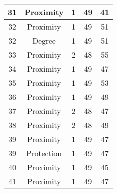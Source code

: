 \documentclass[results.tex]{subfiles}
\begin{document}
\begin{center}
\begin{tabular}{| c || c | c | c | c |}
            \hline
            31                      & Proximity                    & 1                      & 49                      & 41                   \\
            \hline
            32                      & Proximity                    & 1                      & 49                      & 51                   \\
            \hline
            32                      & Degree                       & 1                      & 49                      & 51                   \\
            \hline
            33                      & Proximity                    & 2                      & 48                      & 55                   \\
            \hline
            34                      & Proximity                    & 1                      & 49                      & 47                   \\
            \hline
            35                      & Proximity                    & 1                      & 49                      & 53                   \\
            \hline
            36                      & Proximity                    & 1                      & 49                      & 49                   \\
            \hline
            37                      & Proximity                    & 2                      & 48                      & 47                   \\
            \hline
            38                      & Proximity                    & 2                      & 48                      & 49                   \\
            \hline
            39                      & Proximity                    & 1                      & 49                      & 47                   \\
            \hline
            39                      & Protection                   & 1                      & 49                      & 47                   \\
            \hline
            40                      & Proximity                    & 1                      & 49                      & 45                   \\
            \hline
            41                      & Proximity                    & 1                      & 49                      & 47                   \\

\end{tabular}
\end{center}
\end{document}
